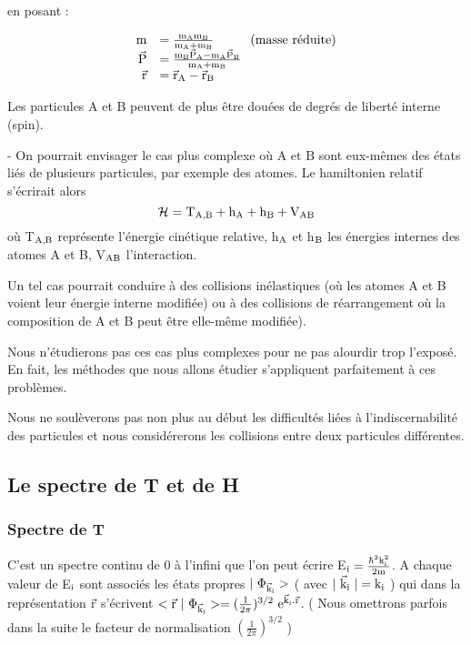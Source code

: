 \begin{minipage}[c]{.35\linewidth}
\begin{center}
en posant :
\end{center}
\end{minipage}
\hfill
\begin{minipage}[c]{.55\linewidth}
\[
\begin{array}{rl}
\text{m} & = \frac{\text{m}_{\text{A}}\text{m}_{\text{B}}}{\text{m}_{\text{A}}+\text{m}_{\text{B}}} \hspace{1cm} \text{(masse réduite)}\\
\vec{\text{P}} & = \frac{\text{m}_{\text{B}}\vec{\text{P}}_{\text{A}}-\text{m}_{\text{A}}\vec{\text{P}}_{\text{B}}}{\text{m}_{\text{A}}+\text{m}_{\text{B}}}\\
\vec{\text{r}} & =\vec{\text{r}}_{\text{A}}-\vec{\text{r}}_{\text{B}}
\end{array}
\]
\end{minipage}

Les particules A et B peuvent de plus être douées de degrés
de liberté interne (spin).

- On pourrait envisager le cas plus complexe où A et B sont
eux-mêmes des états liés de plusieurs particules, par exemple des atomes.
Le hamiltonien relatif s'écrirait alors
\[
\mathcal{H} = \text{T}_{\text{A,B}} + \text{h}_{\text{A}} + \text{h}_{\text{B}} + \text{V}_{\text{AB}}
\]
où T$_{\text{A,B}}$ représente l'énergie cinétique relative, h$_{\text{A}}$ et h$_{\text{B}}$ les énergies internes des
atomes A et B, V$_{\text{AB}}$ l'interaction.

Un tel cas pourrait conduire à des collisions inélastiques
(où les atomes A et B voient leur énergie interne modifiée) ou à des collisions
de réarrangement où la composition de A et B peut être elle-même
modifiée).

Nous n'étudierons pas ces cas plus complexes pour ne pas
alourdir trop l'exposé. En fait, les méthodes que nous allons étudier
s'appliquent parfaitement à ces problèmes.

Nous ne soulèverons pas non plus au début les difficultés
liées à l'indiscernabilité des particules et nous considérerons les collisions
entre deux particules différentes.

\subsection{Le spectre de T et de H}%

\subsubsection{Spectre de T}%
C'est un spectre continu de 0 à l'infini que l'on peut écrire
E$_{\text{i}}=\frac{\hbar^2\text{k}_{\text{i}}^2}{2\text{m}}$. A chaque valeur de E$_{\text{i}}$
sont associés les états propres $|\ \Phi_{\vec{\mt{k}}_\mt{i}}>$
( avec $|\ \vec{\text{k}}_{\text{i}}\ |=\text{k}_{\text{i}}$ ) qui dans la représentation $\vec{\text{r}}$
s'écrivent $<\vec{\mt{r}}\ |\ \Phi_{\vec{\mt{k}}_\mt{i}}>=(\frac{1}{2\pi})^{3/2}\mt{ e}^{\vec{\mt{k}}_\mt{i}.\vec{\mt{r}}}$.
( Nous omettrons parfois dans la suite le facteur de normalisation $(\frac{1}{2\pi})^{3/2}$ )

